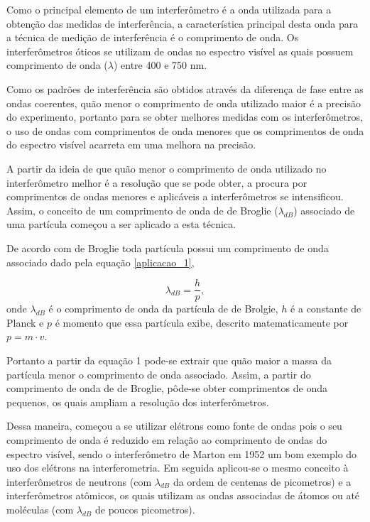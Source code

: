 	\par Como o principal elemento de um interferômetro é a onda utilizada para a obtenção das medidas de interferência, a característica principal desta onda para a técnica de medição de interferência é o comprimento de onda. Os interferômetros óticos se utilizam de ondas no espectro visível as quais possuem comprimento de onda ($\lambda$) entre 400 e 750 nm\cite{ricardo_3}.
	
	\par Como os padrões de interferência são obtidos através da diferença de fase entre as ondas coerentes, quão menor o comprimento de onda utilizado maior é a precisão do experimento\cite{ricardo_2}, portanto para se obter melhores medidas com os interferômetros, o uso de ondas com comprimentos de onda menores que os comprimentos de onda do espectro visível acarreta em uma melhora na precisão.
	
	\par A partir da ideia de que quão menor o comprimento de onda utilizado no interferômetro melhor é a resolução que se pode obter, a procura por comprimentos de ondas menores e aplicáveis a interferômetros se intensificou. Assim, o conceito de um comprimento de onda de de Broglie ($\lambda_{dB}$) associado de uma partícula começou a ser aplicado a esta técnica\cite{ricardo_2}.
	
	\par De acordo com de Broglie toda partícula possui um comprimento de onda associado dado pela equação \eqref{aplicacao_1},

	\begin{equation}
		\label{aplicacao_1}
		\lambda_{dB} = \frac {h}{p},
	\end{equation}
	onde $\lambda_{dB}$ é o comprimento de onda da partícula de de Brolgie, $h$ é a constante de Planck e $p$ é momento que essa partícula exibe, descrito matematicamente por $p =m \cdot v$.\cite{ricardo_2}

	\par Portanto a partir da equação 1 pode-se extrair que quão maior a massa da partícula menor o comprimento de onda associado. Assim, a partir do comprimento de onda de de Broglie, pôde-se obter comprimentos de onda pequenos, os quais ampliam a resolução dos interferômetros\cite{ricardo_2}.
	
	\par Dessa maneira, começou a se utilizar elétrons como fonte de ondas pois o seu comprimento de onda é reduzido em relação ao comprimento de ondas do espectro visível, sendo o interferômetro de Marton em 1952 um bom exemplo do uso dos elétrons na interferometria\cite{ricardo_2}. Em seguida aplicou-se o mesmo conceito à interferômetros de neutrons (com $\lambda_{dB}$ da ordem de centenas de picometros)\cite{ricardo_2} e a interferômetros atômicos, os quais utilizam as ondas associadas de átomos ou até moléculas (com $\lambda_{dB}$ de poucos picometros)\cite{ricardo_2}.
	
